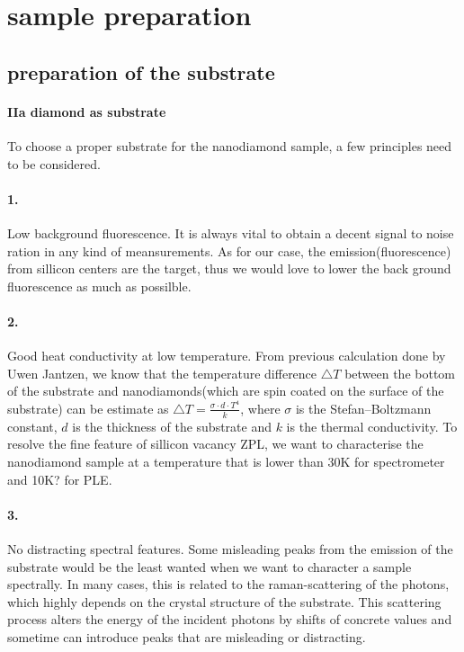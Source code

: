 \section[sample preparation]{sample preparation}
\subsection{preparation of the substrate}
\paragraph{IIa diamond as substrate}

To choose a proper substrate for the nanodiamond sample, a few principles need to be considered.

\paragraph{1.}Low background fluorescence. 
It is always vital to obtain a decent signal to noise ration in any kind of meansurements. As for our case, the emission(fluorescence) from sillicon centers are the target, thus we would love to lower the back ground fluorescence as much as possilble.
\paragraph{2.}Good heat conductivity at low temperature.
From previous calculation done by Uwen Jantzen, we know that the temperature difference $\bigtriangleup T$ between the bottom of the substrate and nanodiamonds(which are spin coated on the surface of the substrate) can be estimate as\newline
$\bigtriangleup T = \frac{\sigma \cdot d \cdot T^{4}}{k} $,
where $\sigma$ is the Stefan–Boltzmann constant, $d$ is the thickness of the substrate and $k$ is the thermal conductivity.
To resolve the fine feature of sillicon vacancy ZPL, we want to characterise the nanodiamond sample at a temperature that is lower than 30K for spectrometer and 10K? for PLE.
\paragraph{3.} No distracting spectral features.
Some misleading peaks from the emission of the substrate would be the least wanted when we want to character a sample spectrally. In many cases, this is related to the raman-scattering of the photons, which highly depends on the crystal structure of the substrate. This scattering process alters the energy of the incident photons by shifts of concrete values and sometime can introduce peaks that are misleading or distracting.

